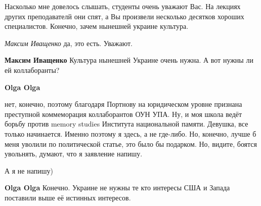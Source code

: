 \begin{itemize}
Насколько мне довелось слышать, студенты очень уважают Вас. На лекциях других
преподавателй они спят, а Вы произвели несколько десятков хороших специалистов.
Конечно, зачем нынешней украине культура.

\begin{itemize}
 
\emph{Максим Иващенко} да, это есть. Уважают.

 
\textbf{Максим Иващенко} Культура нынешней Украине очень нужна. А вот нужны ли ей коллаборанты?

 
\textbf{Olga Olga} 

нет, конечно, поэтому благодаря Портнову на юридическом уровне признана
преступной коммеморация коллаборантов ОУН УПА. Ну, и моя школа ведёт борьбу
против memory studies Института национальной памяти. Девушка, все только
начинается. Именно поэтому я здесь, а не где-либо. Но, конечно, лучше б меня
уволили по политической статье, это было бы подарком. Но, видите, боятся
увольнять, думают, что я заявление напишу.

А я не напишу)

 
\textbf{Olga Olga} Конечно. Украине не нужны те кто интересы США и Запада поставили выше её истинных интересов.

 

\end{itemize}
\end{itemize}
